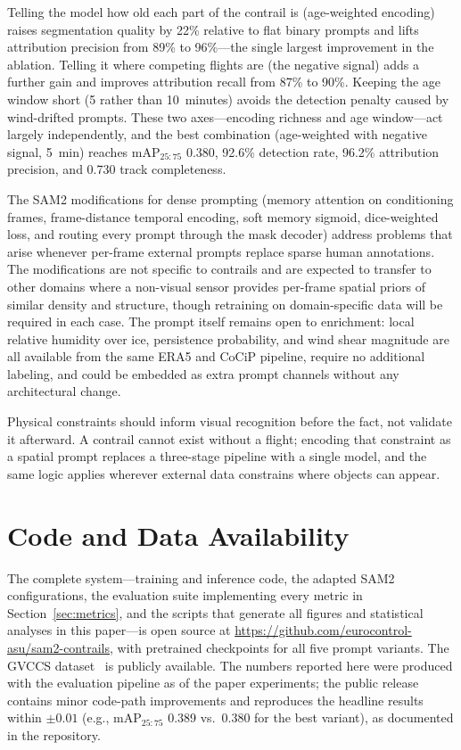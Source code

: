 \documentclass[1p,11pt]{elsarticle}
\begin{document}
Telling the model how old each part of the contrail is (age-weighted encoding) raises segmentation quality by 22\% relative to flat binary prompts and lifts attribution precision from 89\% to 96\%---the single largest improvement in the ablation. Telling it where competing flights are (the negative signal) adds a further gain and improves attribution recall from 87\% to 90\%. Keeping the age window short (5 rather than 10~minutes) avoids the detection penalty caused by wind-drifted prompts. These two axes---encoding richness and age window---act largely independently, and the best combination (age-weighted with negative signal, 5~min) reaches mAP$_{25{:}75}$ 0.380, 92.6\% detection rate, 96.2\% attribution precision, and 0.730 track completeness.

The SAM2 modifications for dense prompting (memory attention on conditioning frames, frame-distance temporal encoding, soft memory sigmoid, dice-weighted loss, and routing every prompt through the mask decoder) address problems that arise whenever per-frame external prompts replace sparse human annotations. The modifications are not specific to contrails and are expected to transfer to other domains where a non-visual sensor provides per-frame spatial priors of similar density and structure, though retraining on domain-specific data will be required in each case. The prompt itself remains open to enrichment: local relative humidity over ice, persistence probability, and wind shear magnitude are all available from the same ERA5 and CoCiP pipeline, require no additional labeling, and could be embedded as extra prompt channels without any architectural change.

Physical constraints should inform visual recognition before the fact, not validate it afterward. A contrail cannot exist without a flight; encoding that constraint as a spatial prompt replaces a three-stage pipeline with a single model, and the same logic applies wherever external data constrains where objects can appear.

\section*{Code and Data Availability}

The complete system---training and inference code, the adapted SAM2 configurations, the evaluation suite implementing every metric in Section~\ref{sec:metrics}, and the scripts that generate all figures and statistical analyses in this paper---is open source at \url{https://github.com/eurocontrol-asu/sam2-contrails}, with pretrained checkpoints for all five prompt variants. The GVCCS dataset~\cite{jarry2025gvccs} is publicly available. The numbers reported here were produced with the evaluation pipeline as of the paper experiments; the public release contains minor code-path improvements and reproduces the headline results within $\pm 0.01$ (e.g., mAP$_{25{:}75}$ 0.389 vs.\ 0.380 for the best variant), as documented in the repository.
\end{document}
